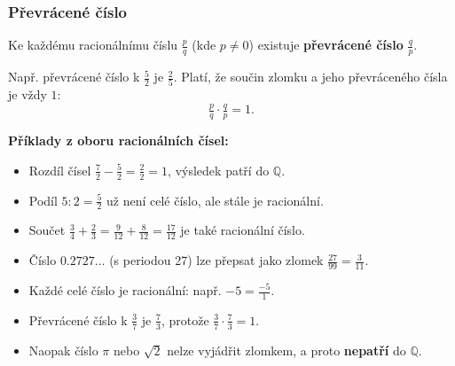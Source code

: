 \documentclass[12pt,a4paper]{article}
\begin{document}
\begin{center}
\end{center}

\subsubsection*{Převrácené číslo}
Ke každému racionálnímu číslu $\tfrac{p}{q}$ (kde $p \neq 0$) existuje \textbf{převrácené číslo} $\tfrac{q}{p}$.  

Např. převrácené číslo k $\tfrac{5}{2}$ je $\tfrac{2}{5}$.  
Platí, že součin zlomku a jeho převráceného čísla je vždy $1$:  
\[
\tfrac{p}{q} \cdot \tfrac{q}{p} = 1.
\]


\begin{examplebox}
\textbf{Příklady z oboru racionálních čísel:}

\begin{itemize}
    \item Rozdíl čísel $\tfrac{7}{2} - \tfrac{5}{2} = \tfrac{2}{2}=1$, výsledek patří do $\mathbb{Q}$.  
    \item Podíl $5:2 = \tfrac{5}{2}$ už není celé číslo, ale stále je racionální.  
    \item Součet $\tfrac{3}{4}+\tfrac{2}{3} = \tfrac{9}{12}+\tfrac{8}{12} = \tfrac{17}{12}$ je také racionální číslo.  
    \item Číslo $0.2727\dots$ (s periodou 27) lze přepsat jako zlomek $\tfrac{27}{99} = \tfrac{3}{11}$.  
    \item Každé celé číslo je racionální: např. $-5 = \tfrac{-5}{1}$.  
    \item Převrácené číslo k $\tfrac{3}{7}$ je $\tfrac{7}{3}$, protože $\tfrac{3}{7}\cdot \tfrac{7}{3}=1$.  
    \item Naopak číslo $\pi$ nebo $\sqrt{2}$ nelze vyjádřit zlomkem, a proto \textbf{nepatří} do $\mathbb{Q}$.  
\end{itemize}
\end{examplebox}
\end{document}
